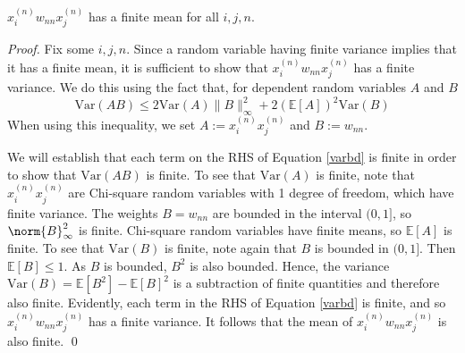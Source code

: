 \documentclass[11pt]{article}
\begin{document}
   
\begin{lemma}
    \label{finitemean}
   $x_i^{(n)} w_{nn} x_j^{(n)}$ has a finite mean for all $i,j,n$. 
\end{lemma}
    \noindent \emph{Proof.} Fix some $i,j,n$. 
    Since a random variable having finite variance implies that it has a finite mean, it is sufficient to show that $x_i^{(n)} w_{nn} x_j^{(n)}$ has a finite variance. We do this using the fact that, for dependent random variables $A$ and $B$
    \begin{equation}
        \label{varbd}
        \mathrm{Var}(AB) \leq  2\mathrm{Var}(A)\lVert B\rVert_\infty^2+2(\mathbb E[A])^2\mathrm{Var}(B)
    \end{equation}
    When using this inequality, we set $A:=x_i^{(n)} x_j^{(n)}$ and $B:=w_{nn}$.

    We will establish that each term on the RHS of Equation \ref{varbd} is finite in order to show that $\mathrm{Var}(AB)$ is finite. To see that $\mathrm{Var}(A)$ is finite, note that $x_i^{(n)} x_j^{(n)}$ are Chi-square random variables with 1 degree of freedom, which have finite variance. The weights $B=w_{nn}$ are bounded in the interval $(0,1]$, so $\norm{B}_\infty^2$ is finite. Chi-square random variables have finite means, so $\mathds{E}[A]$ is finite. To see that $\mathrm{Var}(B)$ is finite, note again that $B$ is bounded in $(0,1]$. Then $\mathds{E}[B] \leq 1$. As $B$ is bounded, $B^2$ is also bounded. Hence, the variance $\mathrm{Var}(B) = \mathds{E}[B^2]-\mathds{E}[B]^2$ is a subtraction of finite quantities and therefore also finite. Evidently, each term in the RHS of Equation \ref{varbd} is finite, and so $x_i^{(n)} w_{nn} x_j^{(n)}$ has a finite variance. It follows that the mean of $x_i^{(n)} w_{nn} x_j^{(n)}$ is also finite.  \qed

    
\end{document}
